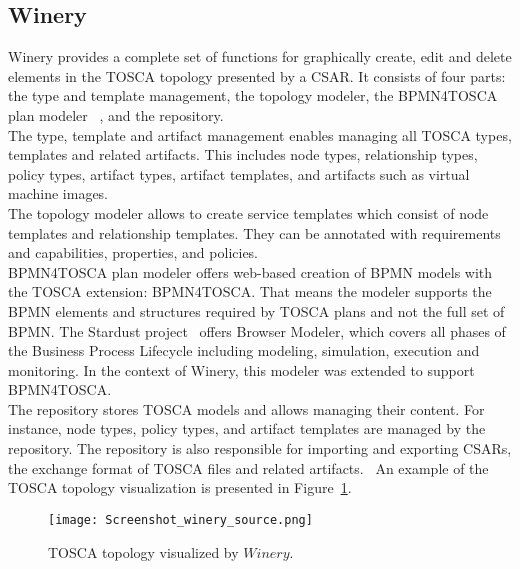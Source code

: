 \subsection*{Winery}\label{subs:wine}\label{tool:winery}
Winery provides a complete set of functions for graphically create, edit and delete elements in the TOSCA topology presented by a CSAR. 
It consists of four parts: the type and template management, the topology modeler, the BPMN4TOSCA plan modeler ~\cite{BPMN4TOSCA}, and the repository.\\
The type, template and artifact management enables managing all TOSCA types, templates and related artifacts. 
This includes node types, relationship types, policy types, artifact types, artifact templates, and artifacts such as virtual machine images.\\
The topology modeler allows to create service templates which consist of node templates and relationship templates. 
They can be annotated with requirements and capabilities, properties, and policies.\\
BPMN4TOSCA plan modeler offers web-based creation of BPMN models with the TOSCA extension: BPMN4TOSCA. 
That means the modeler supports the BPMN elements and structures required by TOSCA plans and not the full set of BPMN. 
The Stardust project~\cite*{stardust} offers Browser Modeler, which covers all phases of the Business Process Lifecycle including modeling, simulation, execution and monitoring. 
In the context of Winery, this modeler was extended to support BPMN4TOSCA.\\
The repository stores TOSCA models and allows managing their content. 
For instance, node types, policy types, and artifact templates are managed by the repository. 
The repository is also responsible for importing and exporting CSARs, the exchange format of TOSCA files and related artifacts.~\cite{winery} %
An example of the TOSCA topology visualization is presented in Figure~\ref{fig:winery_source}.
\begin{figure}[ht]   
\centering
\texttt{[image: Screenshot\_winery\_source.png]}
\caption{TOSCA topology visualized by $Winery$.}
\label{fig:winery_source}
\end{figure}
